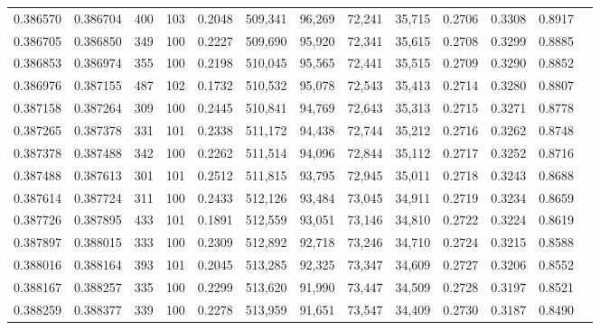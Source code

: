 \begin{tabular}{rrrrrrrrrrrrr}
0.386570 & 0.386704 &   400 & 103 &                                     0.2048 & 509,341 &  96,269 &  72,241 &  35,715 & 0.2706 & 0.3308 & 0.8917 \\
0.386705 & 0.386850 &   349 & 100 &                                     0.2227 & 509,690 &  95,920 &  72,341 &  35,615 & 0.2708 & 0.3299 & 0.8885 \\
0.386853 & 0.386974 &   355 & 100 &                                     0.2198 & 510,045 &  95,565 &  72,441 &  35,515 & 0.2709 & 0.3290 & 0.8852 \\
0.386976 & 0.387155 &   487 & 102 &                                     0.1732 & 510,532 &  95,078 &  72,543 &  35,413 & 0.2714 & 0.3280 & 0.8807 \\
0.387158 & 0.387264 &   309 & 100 &                                     0.2445 & 510,841 &  94,769 &  72,643 &  35,313 & 0.2715 & 0.3271 & 0.8778 \\
0.387265 & 0.387378 &   331 & 101 &                                     0.2338 & 511,172 &  94,438 &  72,744 &  35,212 & 0.2716 & 0.3262 & 0.8748 \\
0.387378 & 0.387488 &   342 & 100 &                                     0.2262 & 511,514 &  94,096 &  72,844 &  35,112 & 0.2717 & 0.3252 & 0.8716 \\
0.387488 & 0.387613 &   301 & 101 &                                     0.2512 & 511,815 &  93,795 &  72,945 &  35,011 & 0.2718 & 0.3243 & 0.8688 \\
0.387614 & 0.387724 &   311 & 100 &                                     0.2433 & 512,126 &  93,484 &  73,045 &  34,911 & 0.2719 & 0.3234 & 0.8659 \\
0.387726 & 0.387895 &   433 & 101 &                                     0.1891 & 512,559 &  93,051 &  73,146 &  34,810 & 0.2722 & 0.3224 & 0.8619 \\
0.387897 & 0.388015 &   333 & 100 &                                     0.2309 & 512,892 &  92,718 &  73,246 &  34,710 & 0.2724 & 0.3215 & 0.8588 \\
0.388016 & 0.388164 &   393 & 101 &                                     0.2045 & 513,285 &  92,325 &  73,347 &  34,609 & 0.2727 & 0.3206 & 0.8552 \\
0.388167 & 0.388257 &   335 & 100 &                                     0.2299 & 513,620 &  91,990 &  73,447 &  34,509 & 0.2728 & 0.3197 & 0.8521 \\
0.388259 & 0.388377 &   339 & 100 &                                     0.2278 & 513,959 &  91,651 &  73,547 &  34,409 & 0.2730 & 0.3187 & 0.8490 \\

\end{tabular}

